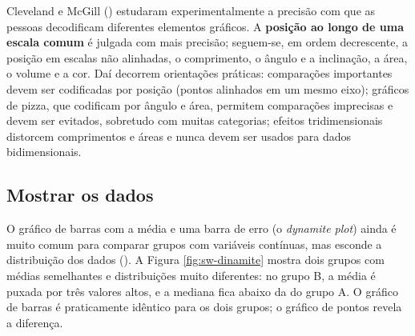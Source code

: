 \documentclass[
]{book}
\begin{document}
Cleveland e McGill () estudaram experimentalmente a precisão com que as pessoas decodificam diferentes elementos gráficos. A \textbf{posição ao longo de uma escala comum} é julgada com mais precisão; seguem-se, em ordem decrescente, a posição em escalas não alinhadas, o comprimento, o ângulo e a inclinação, a área, o volume e a cor. Daí decorrem orientações práticas: comparações importantes devem ser codificadas por posição (pontos alinhados em um mesmo eixo); gráficos de pizza, que codificam por ângulo e área, permitem comparações imprecisas e devem ser evitados, sobretudo com muitas categorias; efeitos tridimensionais distorcem comprimentos e áreas e nunca devem ser usados para dados bidimensionais.

\subsection{Mostrar os dados}\label{mostrar-os-dados}

O gráfico de barras com a média e uma barra de erro (o \emph{dynamite plot}) ainda é muito comum para comparar grupos com variáveis contínuas, mas esconde a distribuição dos dados (). A Figura \ref{fig:sw-dinamite} mostra dois grupos com médias semelhantes e distribuições muito diferentes: no grupo B, a média é puxada por três valores altos, e a mediana fica abaixo da do grupo A. O gráfico de barras é praticamente idêntico para os dois grupos; o gráfico de pontos revela a diferença.
\end{document}
